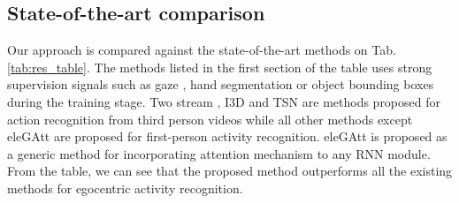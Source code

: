 \documentclass[10pt,twocolumn,letterpaper]{article}
\begin{document}
\begin{matrix*}[r]
\begin{figure*}[t]
\label{fig:att_map}
	\end{figure*}\vspace{-0.1cm}
\label{subsec:spat_att}
































 	\label{sec:exp.ablation}




	












	\subsection{State-of-the-art comparison}
	
	Our approach is compared against the state-of-the-art methods on Tab. \ref{tab:res_table}. The methods listed in the first section of the table uses strong supervision signals such as gaze \cite{li2015delving, li2018eye}, hand segmentation \cite{ma2016deeper} or object bounding boxes \cite{ma2016deeper} during the training stage. Two stream \cite{simonyan2014two}, I3D \cite{carreira2017quo} and TSN \cite{TSN2016ECCV} are methods proposed for action recognition from third person videos while all other methods except eleGAtt \cite{attention_eccv18} are proposed for first-person activity recognition. eleGAtt \cite{attention_eccv18} is proposed as a generic method for incorporating attention mechanism to any RNN module. From the table, we can see that the proposed method outperforms all the existing methods for egocentric activity recognition. 

	




	
	

\end{matrix*}
\end{document}
